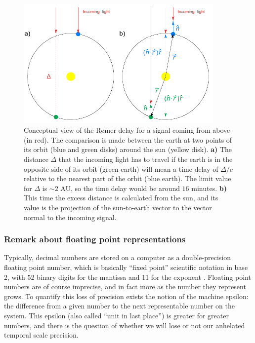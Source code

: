 	\begin{figure}[H]
		\centering
		\includegraphics[width=0.9\textwidth]{img/Heliocentric.pdf}
		\caption[Conceptual view of the R\o{}mer delay]{ Conceptual view of the R\o{}mer delay for a signal coming from above (in red). 
		The comparison is made between the earth at two points of its orbit (blue and green disks) around the sun (yellow disk).
		\textbf{a)} The distance $\Delta$ that the incoming light has to travel if the earth is in the opposite side of its orbit (green earth) will mean a time delay of $\Delta/c$
		relative to the nearest part of the orbit (blue earth).
		The limit value for $\Delta$ is $\sim2$ AU, so the time delay would be around $16$ minutes.
		\textbf{b)} This time the excess distance is calculated from the sun, and its value is the projection of the sun-to-earth vector to the vector normal to the incoming signal.
		}
		\label{fig:romer-delay}
	\end{figure}
	
	
	\subsubsection{Remark about floating point representations}
	
	
	Typically, decimal numbers are stored on a computer as a double-precision floating point number, 
	which is basically \enquote{fixed point} scientific notation in base 2, with 52 binary digits for the mantissa and 11 for the exponent \citep{IEEE2019}.
	Floating point numbers are of course imprecise, and in fact more as the number they represent grows. 
	To quantify this loss of precision exists the notion of the machine epsilon: 
	the difference from a given number to the next representable number on the system.
	This epsilon (also called \enquote{unit in last place}) is greater for greater numbers,
	and there is the question of whether we will lose or not our anhelated temporal scale precision.
	
